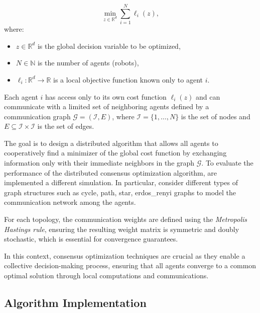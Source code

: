 \begin{equation}
    \min_{z \in \mathbb{R}^d} \sum_{i=1}^N \ell_i(z),
\end{equation}
where:
\begin{itemize}
    \item \( z \in \mathbb{R}^d \) is the global decision variable to be optimized,
    \item \( N \in \mathbb{N} \) is the number of agents (robots),
    \item \( \ell_i: \mathbb{R}^d \rightarrow \mathbb{R} \) is a local objective function known only to agent \( i \).
\end{itemize}

Each agent \( i \) has access only to its own cost function \( \ell_i(z) \) and can communicate with a limited set of neighboring agents defined by a communication graph 
\( \mathcal{G} = (\mathcal{I}, {E}) \), where \( \mathcal{I} = \{1, \dots, N\} \) is the set of nodes and \( E \subseteq \mathcal{I} \times \mathcal{I} \) is the set of edges. 

\noindent
The goal is to design a distributed algorithm that allows all agents to cooperatively find a minimizer of the global cost function by exchanging information only with their 
immediate neighbors in the graph \( \mathcal{G} \).
\noindent
To evaluate the performance of the distributed consensus optimization algorithm, are implemented a different simulation. In particular, consider different types of graph structures 
such as cycle, path, star, erdos\_renyi graphs to model the communication network among the agents. 

\noindent For each topology, the communication weights are defined using the \textit{Metropolis Hastings rule}, ensuring the resulting weight matrix is symmetric and doubly 
stochastic, which is essential for convergence guarantees.


\noindent In this context, consensus optimization techniques are crucial as they enable a collective decision-making process, ensuring that all agents converge to a common 
optimal solution through local computations and communications.


\subsection{Algorithm Implementation}


\begin{tcolorbox}[colback=white,colframe=black!75!black,title=ADD IMPLEMENTATION ]

\end{tcolorbox}


